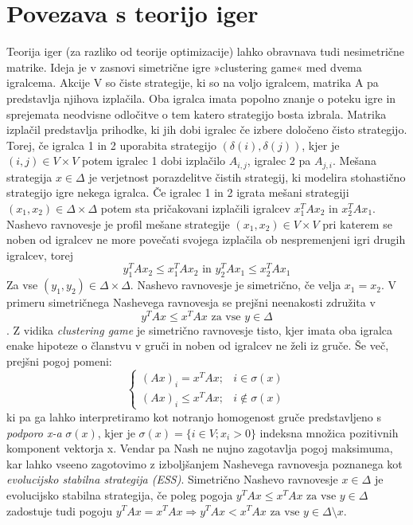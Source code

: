 \documentclass[a4paper]{article}
\begin{document}
\section{Povezava s teorijo iger}
Teorija iger (za razliko od teorije optimizacije) lahko obravnava tudi nesimetrične matrike. Ideja je v zasnovi simetrične igre »clustering game« med dvema igralcema. Akcije V so čiste strategije, ki so na voljo igralcem, matrika A pa predstavlja njihova izplačila. Oba igralca imata popolno znanje o poteku igre in sprejemata neodvisne odločitve o tem katero strategijo bosta izbrala. Matrika izplačil predstavlja prihodke, ki jih dobi igralec če izbere določeno čisto strategijo. Torej, če igralca 1 in 2 uporabita strategijo $(\delta(i),\delta(j))$, kjer je $(i,j)\in V\times V$ potem igralec 1 dobi izplačilo $A_{i,j}$, igralec 2 pa $A_{j,i}$.
Mešana strategija $x\in\Delta$ je verjetnost porazdelitve čistih strategij, ki modelira stohastično strategijo igre nekega igralca. Če igralec 1 in 2 igrata mešani strategiji $(x_1,x_2)\in\Delta\times\Delta$  potem sta pričakovani izplačili igralcev $x_1^TAx_2$ in $x_2^TAx_1$.
Nashevo ravnovesje je profil mešane strategije $(x_1,x_2)\in V\times V$ pri katerem se noben od igralcev ne more povečati svojega izplačila ob nespremenjeni igri drugih igralcev, torej 
$$y_1^TAx_2\leq x_1^TAx_2 \text{ in } y_2^TAx_1\leq x_2^TAx_1$$
Za vse $(y_1,y_2)\in\Delta\times\Delta$. Nashevo ravnovesje je simetrično, če velja $x_1=x_2$. V primeru simetričnega Nashevega ravnovesja se prejšni neenakosti združita v
$$y^TAx\leq x^TAx \text{ za vse } y\in\Delta$$.
Z vidika \textit{clustering game} je simetrično ravnovesje tisto, kjer imata oba igralca enake hipoteze o članstvu v gruči in noben od igralcev ne želi iz gruče. Še več, prejšni pogoj pomeni:
$$\begin{cases}
(Ax)_i=x^TAx; & i\in\sigma(x) \\ (Ax)_i\leq x^TAx; & i\not\in\sigma(x)
\end{cases}$$
ki pa ga lahko interpretiramo kot notranjo homogenost gruče predstavljeno s \textit{podporo x-a} $\sigma(x)$, kjer je $\sigma(x) = \{i\in V; x_i > 0\}$ indeksna množica pozitivnih komponent vektorja x.
Vendar pa Nash ne nujno zagotavlja pogoj maksimuma, kar lahko vseeno zagotovimo z izboljšanjem Nashevega ravnovesja poznanega kot \textit{evolucijsko stabilna strategija (ESS)}. Simetrično Nashevo ravnovesje $x\in\Delta$ je evolucijsko stabilna strategija, če poleg pogoja $y^TAx\leq x^TAx \text{ za vse } y\in\Delta$ zadostuje tudi pogoju $y^TAx= x^TAx \Rightarrow y^TAx<x^TAx \text{ za vse } y\in\Delta\setminus x$.
\end{document}
